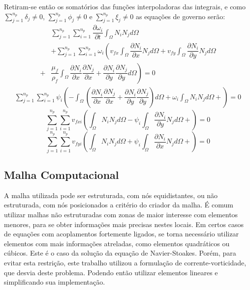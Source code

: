 Retiram-se então os somatórios das funções interpoladoras das integrais, e como $\sum_{j=1}^{n_p} \delta_j \neq 0$, $\sum_{j=1}^{n_p} \phi_j \neq 0$ e $\sum_{j=1}^{n_p} \xi_j \neq 0$ as equações de governo serão:
\begin{align}
    &\sum_{j=1}^{n_p}
    \sum_{i=1}^{n_p} \dfrac{\partial \omega_i}{\partial t}
    \int_{\Omega}
    N_i N_j
    d\Omega \nonumber\\&+
    \sum_{j=1}^{n_p}
    \sum_{i=1}^{n_p}
    \omega_i
    \left(
        v_{fx}
        \int_{\Omega}
        \dfrac{\partial N_i}{\partial x}
        N_j
        d\Omega +
        v_{fy}
        \int_{\Omega}
        \dfrac{\partial N_i}{\partial y}
        N_j
        d\Omega \right.\nonumber\\ +& \left.
        \dfrac{\mu_f}{\rho_f}
        \int_{\Omega}
        \dfrac{\partial N_i}{\partial x}
        \dfrac{\partial N_j}{\partial x} +
        \dfrac{\partial N_i}{\partial y}
        \dfrac{\partial N_j}{\partial y}
        d\Omega
    \right) = 0
\end{align}
\begin{align}
    \sum_{j=1}^{n_p}
    \sum_{i=1}^{n_p}
    \psi_i
    \left(
        -\int_{\Omega} \left(
        \dfrac{\partial N_i}{\partial x}
        \dfrac{\partial N_j}{\partial x} +
        \dfrac{\partial N_i}{\partial y}
        \dfrac{\partial N_j}{\partial y}
        \right) d\Omega +
        \omega_i
        \int_{\Omega}
        N_i
        N_j
        d\Omega +
    \right) = 0
\end{align}
\begin{equation}
    \sum_{j=1}^{n_p}
    \sum_{i=1}^{n_p}
    v_{fxi}
    \left(
        \int_{\Omega}
        N_i
        N_j
        d\Omega -
        \psi_i
        \int_{\Omega}
        \dfrac{\partial N_i}{\partial y}
        N_j
        d\Omega +
    \right) = 0
\end{equation}
\begin{equation}
    \sum_{j=1}^{n_p}
    \sum_{i=1}^{n_p}
    v_{fyi}
    \left(
        \int_{\Omega}
        N_i
        N_j
        d\Omega +
        \psi_i
        \int_{\Omega}
        \dfrac{\partial N_i}{\partial x}
        N_j
        d\Omega +
    \right) = 0
\end{equation}

\subsection{\textbf{Malha Computacional}}
A malha utilizada pode ser estruturada, com nós equidistantes, ou não estruturada, com nós posicionados a critério do criador da malha.
É comum utilizar malhas não estruturadas com zonas de maior interesse com elementos menores, para se obter informações mais precisas nestes locais.
Em certos casos de equações com acoplamentos fortemente ligados, se torna necessário utilizar elementos com mais informações atreladas, como elementos quadráticos ou cúbicos.
Este é o caso da solução da equação de Navier-Stoakes.
Porém, para evitar esta restrição, este trabalho utilizou a formulação de corrente-vorticidade, que desvia deste problema.
Podendo então utilizar elementos lineares e simplificando sua implementação.

